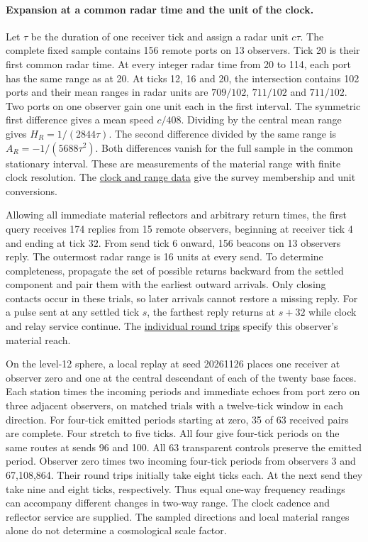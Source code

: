 \documentclass[11pt]{article}
\theoremstyle{remark}
\begin{document}
\paragraph{Expansion at a common radar time and the unit of the clock.}
Let $\tau$ be the duration of one receiver tick and assign a radar unit
$c\tau$. The complete fixed sample contains 156 remote ports on 13
observers. Tick 20 is their first common radar time. At every integer
radar time from 20 to 114, each port has the same range as at 20.
At ticks 12, 16 and 20, the intersection contains 102 ports and their
mean ranges in radar units are $709/102$, $711/102$ and $711/102$.
Two ports on one observer gain one unit each in the first interval.
The symmetric first difference gives a mean speed $c/408$. Dividing by
the central mean range gives $H_R=1/(2844\tau)$. The second difference
divided by the same range is $A_R=-1/(5688\tau^2)$. Both differences
vanish for the full sample in the common stationary interval. These
are measurements of the material range with finite clock resolution.
The \href{https://dovybzrnzxfo1.cloudfront.net/analysis/observer_zero_expansion.json}{clock
and range data} give the survey membership and unit conversions.

Allowing all immediate material reflectors and arbitrary return times,
the first query receives 174 replies from 15 remote observers, beginning
at receiver tick 4 and ending at tick 32. From send tick 6 onward, 156
beacons on 13 observers reply. The outermost radar range is 16 units at
every send. To determine completeness, propagate the set of possible
returns backward from the settled component and pair them with the
earliest outward arrivals. Only closing contacts occur in these trials,
so later arrivals cannot restore a missing reply. For a pulse sent at any
settled tick $s$, the farthest reply returns at $s+32$ while clock and
relay service continue. The \href{https://dovybzrnzxfo1.cloudfront.net/analysis/observer_zero_reach.json}{individual
round trips} specify this observer's material reach.

On the level-12 sphere, a local replay at seed 20261126 places one
receiver at observer zero and one at the central descendant of each of
the twenty base faces. Each station times the incoming periods and
immediate echoes from port zero on three adjacent observers, on matched
trials with a twelve-tick window in each direction. For four-tick
emitted periods starting at zero, 35 of 63 received pairs are complete.
Four stretch to five ticks. All four give four-tick periods on the
same routes at sends 96 and 100. All 63 transparent controls preserve
the emitted period. Observer zero times two incoming four-tick periods
from observers 3 and 67,108,864. Their round trips initially take eight
ticks each. At the next send they take nine and eight ticks, respectively.
Thus equal one-way frequency readings can accompany different changes
in two-way range. The clock cadence and reflector service are supplied.
The sampled directions and local material ranges alone do not determine
a cosmological scale factor.
\end{document}
